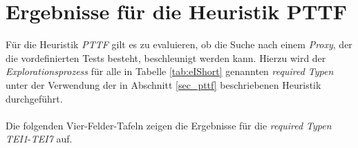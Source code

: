 \section{Ergebnisse für die Heuristik PTTF}\label{sec_evalPTTF}
Für die \Gls{Heuristik} \emph{PTTF} gilt es zu evaluieren, ob die Suche nach einem \emph{Proxy}, der die vordefinierten Tests besteht, beschleunigt werden kann. Hierzu wird der \emph{Explorationsprozess} für alle in Tabelle \ref{tab:eIShort} genannten \emph{required Typen} unter der Verwendung der in Abschnitt \ref{sec_pttf} beschriebenen \Gls{Heuristik} durchgeführt.
\\\\
Die folgenden Vier-Felder-Tafeln zeigen die Ergebnisse für die \emph{required Typen} \emph{TEI1}-\emph{TEI7} auf.
\begin{multicols}{3}
\end{multicols}
\pagebreak
\begin{multicols}{2}
\end{multicols}

\begin{multicols}{2}
\end{multicols}

